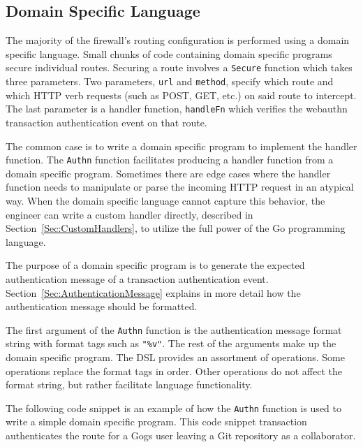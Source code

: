 

\subsection{Domain Specific Language}\label{Sec:DomainSpecificLanguage}

The majority of the firewall's routing configuration is performed using a domain specific language. Small chunks of code containing domain specific programs secure individual routes. Securing a route involves a \lstinline{Secure} function which takes three parameters. Two parameters, \lstinline{url} and \lstinline{method}, specify which route and which HTTP verb requests (such as POST, GET, etc.) on said route to intercept. The last parameter is a handler function, \lstinline{handleFn} which verifies the webauthn transaction authentication event on that route. 

The common case is to write a domain specific program to implement the handler function. The \lstinline{Authn} function facilitates producing a handler function from a domain specific program. Sometimes there are edge cases where the handler function needs to manipulate or parse the incoming HTTP request in an atypical way. When the domain specific language cannot capture this behavior, the engineer can write a custom handler directly, described in Section~\ref{Sec:CustomHandlers}, to utilize the full power of the Go programming language.

The purpose of a domain specific program is to generate the expected authentication message of a transaction authentication event. Section~\ref{Sec:AuthenticationMessage} explains in more detail how the authentication message should be formatted. 

The first argument of the \lstinline{Authn} function is the authentication message format string with format tags such as \lstinline{"%v"}. The rest of the arguments make up the domain specific program. The DSL provides an assortment of operations. Some operations replace the format tags in order. Other operations do not affect the format string, but rather facilitate language functionality.

The following code snippet is an example of how the \lstinline{Authn} function is used to write a simple domain specific program. This code snippet transaction authenticates the route for a Gogs user leaving a Git repository as a collaborator. 

